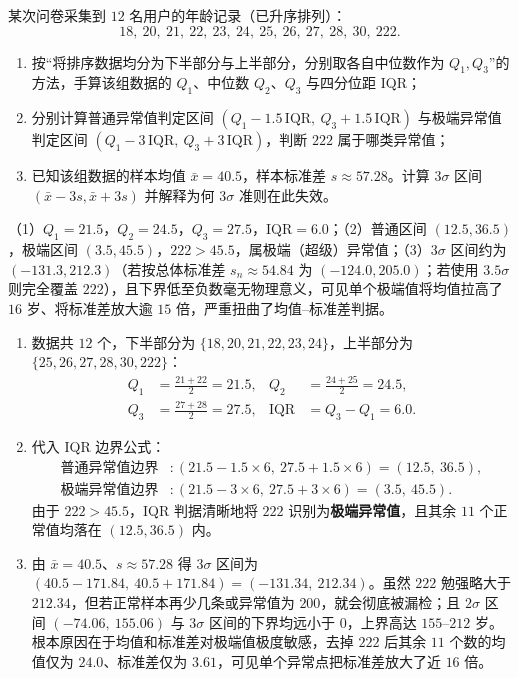 \begin{exercise}[title={五数概括、IQR 异常值检测与 $k\sigma$ 掩蔽效应},level=standard,points=15,tags={箱线图,IQR,异常值}]
某次问卷采集到 $12$ 名用户的年龄记录（已升序排列）：
\[
  18,\ 20,\ 21,\ 22,\ 23,\ 24,\ 25,\ 26,\ 27,\ 28,\ 30,\ 222.
\]
\begin{enumerate}
  \item 按“将排序数据均分为下半部分与上半部分，分别取各自中位数作为 $Q_1, Q_3$”的方法，手算该组数据的 $Q_1$、中位数 $Q_2$、$Q_3$ 与四分位距 $\mathrm{IQR}$；
  \item 分别计算普通异常值判定区间 $(Q_1 - 1.5\,\mathrm{IQR},\ Q_3 + 1.5\,\mathrm{IQR})$ 与极端异常值判定区间 $(Q_1 - 3\,\mathrm{IQR},\ Q_3 + 3\,\mathrm{IQR})$，判断 $222$ 属于哪类异常值；
  \item 已知该组数据的样本均值 $\bar{x} = 40.5$，样本标准差 $s \approx 57.28$。计算 $3\sigma$ 区间 $(\bar{x}-3s, \bar{x}+3s)$ 并解释为何 $3\sigma$ 准则在此失效。
\end{enumerate}
\begin{answer}
（1）$Q_1 = 21.5$，$Q_2 = 24.5$，$Q_3 = 27.5$，$\mathrm{IQR} = 6.0$；（2）普通区间 $(12.5, 36.5)$，极端区间 $(3.5, 45.5)$，$222 > 45.5$，属极端（超级）异常值；（3）$3\sigma$ 区间约为 $(-131.3, 212.3)$（若按总体标准差 $s_n\approx 54.84$ 为 $(-124.0, 205.0)$；若使用 $3.5\sigma$ 则完全覆盖 $222$），且下界低至负数毫无物理意义，可见单个极端值将均值拉高了 $16$ 岁、将标准差放大逾 $15$ 倍，严重扭曲了均值–标准差判据。
\end{answer}
\begin{solution}
\begin{enumerate}
  \item 数据共 $12$ 个，下半部分为 $\{18, 20, 21, 22, 23, 24\}$，上半部分为 $\{25, 26, 27, 28, 30, 222\}$：
  \[\begin{aligned}
    Q_1 &= \frac{21 + 22}{2} = 21.5, &
    Q_2 &= \frac{24 + 25}{2} = 24.5, \\
    Q_3 &= \frac{27 + 28}{2} = 27.5, &
    \mathrm{IQR} &= Q_3 - Q_1 = 6.0.
  \end{aligned}\]
  \item 代入 IQR 边界公式：
  \[\begin{aligned}
    \text{普通异常值边界} &: (21.5 - 1.5\times 6,\ 27.5 + 1.5\times 6) = (12.5,\ 36.5), \\
    \text{极端异常值边界} &: (21.5 - 3\times 6,\ 27.5 + 3\times 6) = (3.5,\ 45.5).
  \end{aligned}\]
  由于 $222 > 45.5$，IQR 判据清晰地将 $222$ 识别为\textbf{极端异常值}，且其余 $11$ 个正常值均落在 $(12.5, 36.5)$ 内。
  \item 由 $\bar{x} = 40.5$、$s \approx 57.28$ 得 $3\sigma$ 区间为 $(40.5 - 171.84,\ 40.5 + 171.84) = (-131.34,\ 212.34)$。虽然 $222$ 勉强略大于 $212.34$，但若正常样本再少几条或异常值为 $200$，就会彻底被漏检；且 $2\sigma$ 区间 $(-74.06,\ 155.06)$ 与 $3\sigma$ 区间的下界均远小于 $0$，上界高达 $155$–$212$ 岁。根本原因在于均值和标准差对极端值极度敏感，去掉 $222$ 后其余 $11$ 个数的均值仅为 $24.0$、标准差仅为 $3.61$，可见单个异常点把标准差放大了近 $16$ 倍。
\end{enumerate}
\end{solution}
\end{exercise}

